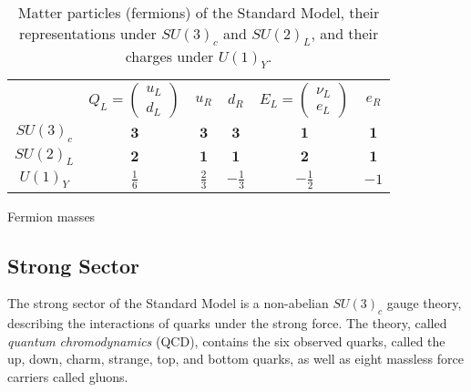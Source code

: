 \begin{table}[htbp]
	\centering
	\begin{tabular}{cccccc}
		 & $Q_L=\left(\begin{array}{c} u_L \\ d_L \end{array}\right)$ & $u_R$ & $d_R$ & $E_L=\left(\begin{array}{c} \nu_L \\ e_L \end{array}\right) $ & $e_R$ \\
		$SU(3)_c$ & $\mathbf{3}$ &  $\mathbf{3}$ & $\mathbf{3}$ & $\mathbf{1}$ & $\mathbf{1}$ \\
		$SU(2)_L$ & $\mathbf{2}$ & $\mathbf{1}$ & $\mathbf{1}$ & $\mathbf{2}$ & $\mathbf{1}$ \\
		$U(1)_Y$ & $\frac16$ & $\frac23$ & $-\frac13$ & $-\frac12$ & $-1$ \\
	\end{tabular}
	\caption{Matter particles (fermions) of the Standard Model, their representations under $SU(3)_c$ and $SU(2)_L$, and their charges under $U(1)_Y$.}
	\label{table:standard-model-particles}
\end{table}

\begin{table}
	Fermion masses
\end{table}


\subsection{Strong Sector}




The strong sector of the Standard Model is a non-abelian $SU(3)_c$ gauge theory, describing the interactions of quarks under the strong force. The theory, called \emph{quantum chromodynamics} (QCD), contains the six observed quarks, called the up, down, charm, strange, top, and bottom quarks, as well as eight massless force carriers called gluons. 


